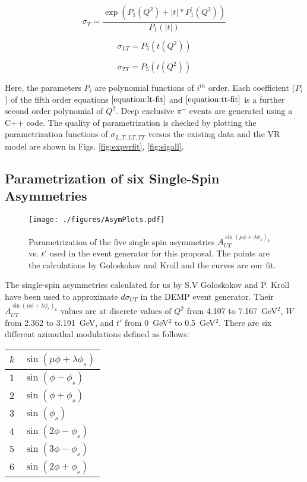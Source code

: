 \begin{equation}
        \sigma_{T} = \frac{\exp{(P_1(Q^2) + |t| *
        P^{\prime}_1(Q^2))}}{P_{1}(|t|)}
     \label{equation:t-fit}
\end{equation}

\begin{equation}
        \sigma_{LT} = P_{5}(t(Q^2))
     \label{equation:lt-fit}
\end{equation}

\begin{equation}
        \sigma_{TT} = P_{5}(t(Q^2))       
     \label{equation:tt-fit}
\end{equation}

Here, the parameters $P_{i}$ are polynomial functions of $i^{th}$ order. Each
coefficient ($P_{i}$) of the fifth order equations $\ref{equation:lt-fit}$ and
$\ref{equation:tt-fit}$ is a further second order polynomial of $Q^2$. Deep
exclusive $\pi^{-}$ events are generated using a C++ code. The quality of
parametrization is checked by plotting the parametrization functions of
$\sigma_{L,T,LT,TT}$ versus the existing data and the VR model are shown in 
Figs. \ref{fig:expvrfit}, \ref{fig:sigall}.

\subsection{Parametrization of six Single-Spin Asymmetries
\label{sec:asymparametrizations}}

\begin{figure}[!hbt]
    \centering
    \texttt{[image: ./figures/AsymPlots.pdf]}
    \caption{Parametrization of the five single spin asymmetries
      $A_{UT}^{\sin(\mu\phi+\lambda\phi_s)_k}$ vs. $t'$ used in the event
      generator for this proposal.  The points are the calculations by
      Goloskokov and Kroll \cite{GoPC} and the curves are our fit.}
    \label{fig:asym-1}
\end{figure}

The single-spin asymmetries calculated for us by S.V Goloskokov and P. Kroll
\cite{GoPC} have been used to approximate $d\sigma_{UT}$ in the
DEMP event generator.  Their $A_{UT}^{\sin(\mu\phi+\lambda\phi_s)_k}$ values are
at discrete values of $Q^2$ from 4.107 to 7.167~GeV$^2$, $W$ from 2.362 to
3.191~GeV, and $t'$ from 0~GeV$^2$ to 0.5~GeV$^2$.  There are six different 
azimuthal modulations defined as follows:
\begin{center}
\begin{tabular}{ l|l }
  $k$ & $\sin(\mu\phi+\lambda\phi_s)$ \\
  \hline
  $1$ & $\sin(\phi-\phi_s)$ \\
  $2$ & $\sin(\phi+\phi_s)$ \\
  $3$ & $\sin(\phi_s)$ \\
  $4$ & $\sin(2\phi-\phi_s)$ \\
  $5$ & $\sin(3\phi-\phi_s)$ \\
  $6$ & $\sin(2\phi+\phi_s)$
\end{tabular}
\end{center}

